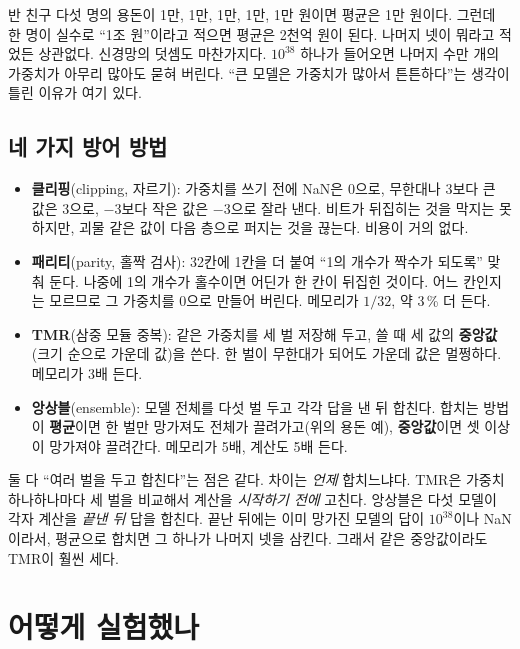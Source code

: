 \documentclass[11pt,a4paper]{article}
\newcounter{easy}
\begin{document}
\begin{easy}
반 친구 다섯 명의 용돈이 1만, 1만, 1만, 1만, 1만 원이면 평균은 1만 원이다. 그런데 한 명이 실수로 ``1조 원''이라고 적으면 평균은 2천억 원이 된다. 나머지 넷이 뭐라고 적었든 상관없다. 신경망의 덧셈도 마찬가지다. $10^{38}$ 하나가 들어오면 나머지 수만 개의 가중치가 아무리 많아도 묻혀 버린다. ``큰 모델은 가중치가 많아서 튼튼하다''는 생각이 틀린 이유가 여기 있다.
\end{easy}

\subsection{네 가지 방어 방법}
\begin{itemize}[leftmargin=*]
  \item \textbf{클리핑}(clipping, 자르기): 가중치를 쓰기 전에 NaN은 0으로, 무한대나 $3$보다 큰 값은 $3$으로, $-3$보다 작은 값은 $-3$으로 잘라 낸다. 비트가 뒤집히는 것을 막지는 못하지만, 괴물 같은 값이 다음 층으로 퍼지는 것을 끊는다. 비용이 거의 없다.
  \item \textbf{패리티}(parity, 홀짝 검사): 32칸에 1칸을 더 붙여 ``1의 개수가 짝수가 되도록'' 맞춰 둔다. 나중에 1의 개수가 홀수이면 어딘가 한 칸이 뒤집힌 것이다. 어느 칸인지는 모르므로 그 가중치를 0으로 만들어 버린다. 메모리가 $1/32$, 약 3\,\% 더 든다.
  \item \textbf{TMR}(삼중 모듈 중복): 같은 가중치를 세 벌 저장해 두고, 쓸 때 세 값의 \textbf{중앙값}(크기 순으로 가운데 값)을 쓴다. 한 벌이 무한대가 되어도 가운데 값은 멀쩡하다. 메모리가 3배 든다.
  \item \textbf{앙상블}(ensemble): 모델 전체를 다섯 벌 두고 각각 답을 낸 뒤 합친다. 합치는 방법이 \textbf{평균}이면 한 벌만 망가져도 전체가 끌려가고(위의 용돈 예), \textbf{중앙값}이면 셋 이상이 망가져야 끌려간다. 메모리가 5배, 계산도 5배 든다.
\end{itemize}

\begin{easy}
둘 다 ``여러 벌을 두고 합친다''는 점은 같다. 차이는 \emph{언제} 합치느냐다. TMR은 가중치 하나하나마다 세 벌을 비교해서 계산을 \emph{시작하기 전에} 고친다. 앙상블은 다섯 모델이 각자 계산을 \emph{끝낸 뒤} 답을 합친다. 끝난 뒤에는 이미 망가진 모델의 답이 $10^{38}$이나 NaN이라서, 평균으로 합치면 그 하나가 나머지 넷을 삼킨다. 그래서 같은 중앙값이라도 TMR이 훨씬 세다.
\end{easy}

\section{어떻게 실험했나}
\end{document}
